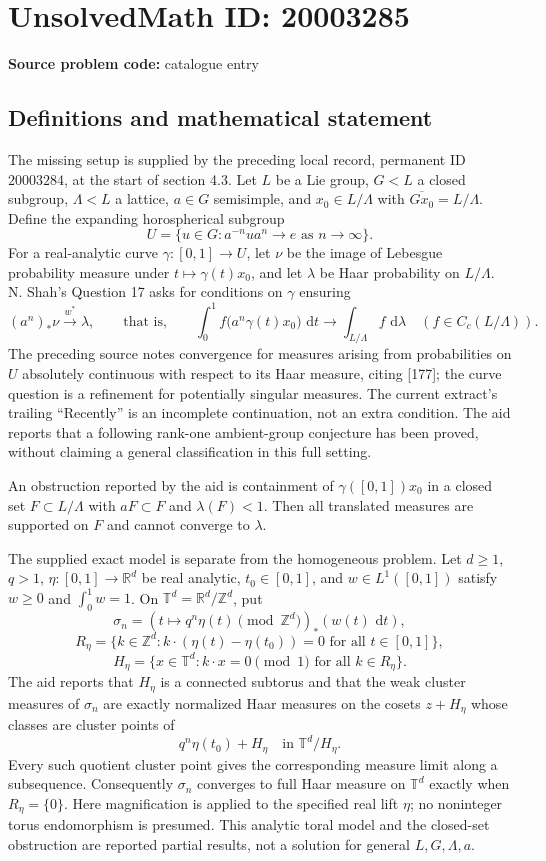 \documentclass[11pt]{article}
\newcommand{\Z}{\mathbb{Z}}
\newcommand{\R}{\mathbb{R}}
\newcommand{\dd}{\,\mathrm{d}}
\begin{document}
\section*{UnsolvedMath ID: 20003285}
\textbf{Source problem code:} catalogue entry
\subsection{Definitions and mathematical statement}
The missing setup is supplied by the preceding local record, permanent ID $20003284$, at the start of section 4.3. Let $L$ be a Lie group, $G<L$ a closed subgroup, $\Lambda<L$ a lattice, $a\in G$ semisimple, and $x_0\in L/\Lambda$ with $\overline{Gx_0}=L/\Lambda$. Define the expanding horospherical subgroup
\[
 U=\{u\in G:a^{-n}ua^n\longrightarrow e\text{ as }n\to\infty\}.
\]
For a real-analytic curve $\gamma:[0,1]\to U$, let $\nu$ be the image of Lebesgue probability measure under $t\mapsto\gamma(t)x_0$, and let $\lambda$ be Haar probability on $L/\Lambda$. N. Shah's Question 17 asks for conditions on $\gamma$ ensuring
\[
 (a^n)_*\nu\overset{w^*}{\longrightarrow}\lambda,
 \qquad\text{that is,}\qquad
 \int_0^1 f\bigl(a^n\gamma(t)x_0\bigr)\,\dd t
 \longrightarrow\int_{L/\Lambda}f\,\dd\lambda
 \quad(f\in C_c(L/\Lambda)).
\]
The preceding source notes convergence for measures arising from probabilities on $U$ absolutely continuous with respect to its Haar measure, citing [177]; the curve question is a refinement for potentially singular measures. The current extract's trailing ``Recently'' is an incomplete continuation, not an extra condition. The aid reports that a following rank-one ambient-group conjecture has been proved, without claiming a general classification in this full setting.

An obstruction reported by the aid is containment of $\gamma([0,1])x_0$ in a closed set $F\subset L/\Lambda$ with $aF\subset F$ and $\lambda(F)<1$. Then all translated measures are supported on $F$ and cannot converge to $\lambda$.

The supplied exact model is separate from the homogeneous problem. Let $d\ge1$, $q>1$, $\eta:[0,1]\to\R^d$ be real analytic, $t_0\in[0,1]$, and $w\in L^1([0,1])$ satisfy $w\ge0$ and $\int_0^1w=1$. On $\mathbb T^d=\R^d/\Z^d$, put
\[
 \sigma_n=(t\mapsto q^n\eta(t)\pmod{\Z^d})_*(w(t)\,\dd t),
\]
\[
 R_\eta=\{k\in\Z^d:k\cdot(\eta(t)-\eta(t_0))=0\text{ for all }t\in[0,1]\},
\]
\[
 H_\eta=\{x\in\mathbb T^d:k\cdot x=0\pmod1\text{ for all }k\in R_\eta\}.
\]
The aid reports that $H_\eta$ is a connected subtorus and that the weak cluster measures of $\sigma_n$ are exactly normalized Haar measures on the cosets $z+H_\eta$ whose classes are cluster points of
\[
 q^n\eta(t_0)+H_\eta\quad\text{in }\mathbb T^d/H_\eta.
\]
Every such quotient cluster point gives the corresponding measure limit along a subsequence. Consequently $\sigma_n$ converges to full Haar measure on $\mathbb T^d$ exactly when $R_\eta=\{0\}$. Here magnification is applied to the specified real lift $\eta$; no noninteger torus endomorphism is presumed. This analytic toral model and the closed-set obstruction are reported partial results, not a solution for general $L,G,\Lambda,a$.
\end{document}
